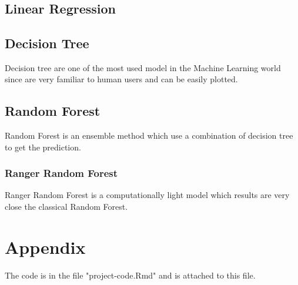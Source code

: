 \documentclass{FR16}
\begin{document}
\
\subsection{Linear Regression}


\subsection{Decision Tree}
Decision  tree are one of the most used model in the Machine Learning world since are very familiar to human users and can be easily plotted. 
\\



\subsection{Random Forest}
Random Forest is an ensemble method which use a combination of decision tree to get the prediction.
\subsubsection{Ranger Random Forest}
Ranger Random Forest is a computationally light model which results are very close the classical Random Forest.
\\





\newpage
\section{Appendix}
%
The code is in the file "project-code.Rmd" and is attached to this file.

%
\end{document}
